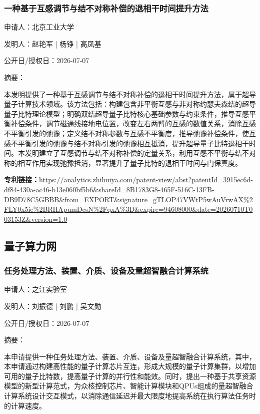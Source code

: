 \documentclass[12pt,a4paper]{ctexart}
\begin{document}
\subsubsection{ 一种基于互感调节与结不对称补偿的退相干时间提升方法 }

申请人：北京工业大学

发明人：赵艳军 | 杨铮 | 高凤基

公开日/授权日：2026-07-07

摘要：

本发明提供了一种基于互感调节与结不对称补偿的退相干时间提升方法，属于超导量子计算技术领域。该方法包括：构建包含非平衡互感与非对称约瑟夫森结的超导量子比特理论模型；明确双结超导量子比特核心基础参数与约束条件，推导互感平衡补偿条件，调节磁通线接地电位置，改变左右两臂的互感的数值关系，消除互感不平衡引发的弛豫；定义结不对称参数与互感不平衡度，推导弛豫补偿条件，使互感不平衡引发的弛豫与结不对称引发的弛豫相互抵消，提升超导量子比特退相干时间。本发明建立了互感调节与结不对称补偿的定量关系，利用互感不平衡与结不对称的相互作用实现弛豫抵消，显著提升了量子比特的退相干时间与门保真度。

\noindent\textbf{专利链接：}\url{https://analytics.zhihuiya.com/patent-view/abst?patentId=3915ec6d-df84-430a-ac46-b13e060bf5b6&shareId=8B1783G8-465F-516C-13FB-DB9D78C5GBBB&from=EXPORT&signature=gTLOP47VWtP5wAuVrwAX%2FLY0x5ie%2BRHApumDcsN%2FqxA%3D&expire=94608000&date=20260710T003153Z&version=1.0}


\subsection{ 量子算力网 }

\subsubsection{ 任务处理方法、装置、介质、设备及量超智融合计算系统 }

申请人：之江实验室

发明人：刘振德 | 刘鹏 | 吴文勋

公开日/授权日：2026-07-07

摘要：

本申请提供一种任务处理方法、装置、介质、设备及量超智融合计算系统，其中，本申请通过构建高性能的量子计算芯片互连，形成大规模的量子计算集群，以增加可用的量子比特数，提高量子计算的并行性和能效。同时，提出一种基于共享资源模型的新型计算范式，为众核控制芯片、智能计算模块和QPUs组成的量超智融合计算系统设计交互模式，以消除通信延迟并最大限度地提高系统在执行算法任务时的计算速度。
\end{document}
